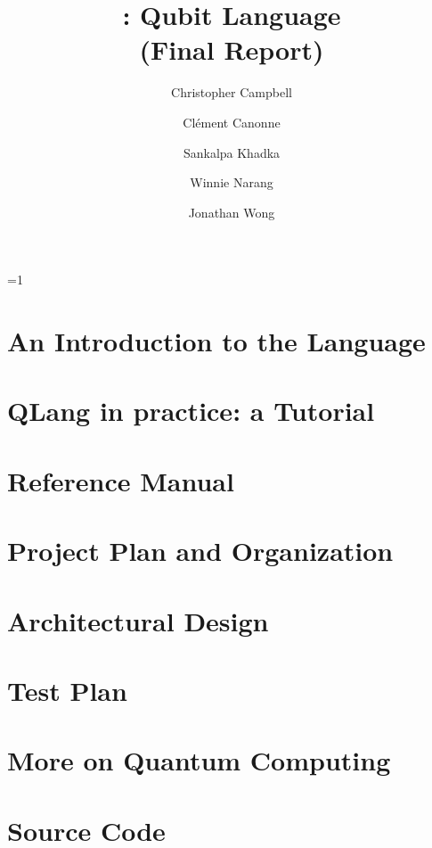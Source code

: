 \documentclass[11pt]{report}
\title{\QL: Qubit Language\\ \Large(Final Report)}
\author{
  Christopher Campbell
  \and Cl\'ement Canonne
  \and Sankalpa Khadka
  \and Winnie Narang
  \and Jonathan Wong
}
\def\withnotes{1}
\newcommand{\QL}{\textsf{QLang}\xspace}
\begin{document}
\maketitle
\tableofcontents

\ifnum\withnotes=1
  \listoftodos
\fi

\chapter{An Introduction to the Language}
  
\chapter{\QL in practice: a Tutorial}
  
\chapter{Reference Manual}\label{sec:reference}
  
\chapter{Project Plan and Organization}
\chapter{Architectural Design}
\chapter{Test Plan}
\appendix
\chapter{More on Quantum Computing}\label{app:quantum:more}
  
\chapter{Source Code}
\end{document}
